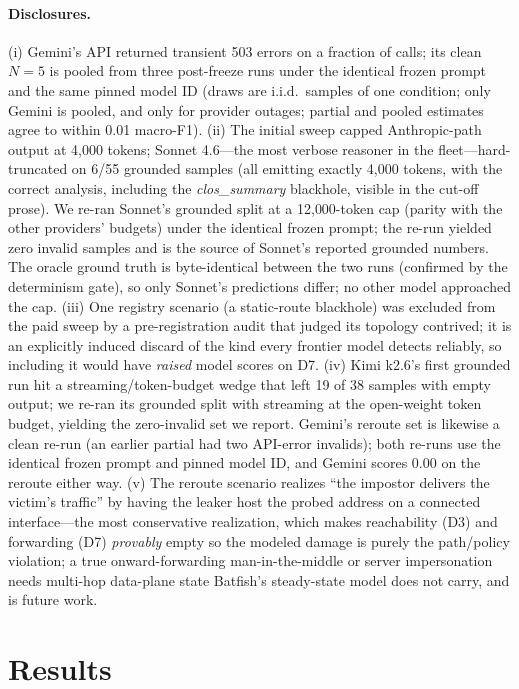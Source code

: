 \documentclass[11pt]{article}
\begin{document}
\paragraph{Disclosures.} (i) Gemini's API returned transient 503 errors on a
fraction of calls; its clean $N{=}5$ is pooled from three post-freeze runs
under the identical frozen prompt and the same pinned model ID (draws are
i.i.d.\ samples of one condition; only Gemini is pooled, and only for
provider outages; partial and pooled estimates agree to within 0.01
macro-F1). (ii) The initial sweep capped Anthropic-path output at 4{,}000
tokens; Sonnet 4.6---the most verbose reasoner in the fleet---hard-truncated
on 6/55 grounded samples (all emitting exactly 4{,}000 tokens, with the
correct analysis, including the \emph{clos\_summary} blackhole, visible in the
cut-off prose). We re-ran Sonnet's grounded split at a 12{,}000-token cap
(parity with the other providers' budgets) under the identical frozen prompt;
the re-run yielded zero invalid samples and is the source of Sonnet's reported
grounded numbers. The oracle ground truth is byte-identical between the two
runs (confirmed by the determinism gate), so only Sonnet's predictions differ;
no other model approached the cap. (iii) One registry scenario (a static-route
blackhole) was excluded from the paid sweep by a pre-registration audit that
judged its topology contrived; it is an explicitly induced discard of the kind
every frontier model detects reliably, so including it would have \emph{raised}
model scores on D7. (iv) Kimi k2.6's first grounded run hit a
streaming/token-budget wedge that left 19 of 38 samples with empty output; we
re-ran its grounded split with streaming at the open-weight token budget,
yielding the zero-invalid set we report. Gemini's reroute set is likewise a
clean re-run (an earlier partial had two API-error invalids); both re-runs use
the identical frozen prompt and pinned model ID, and Gemini scores 0.00 on the
reroute either way. (v) The reroute scenario realizes ``the impostor delivers
the victim's traffic'' by having the leaker host the probed address on a
connected interface---the most conservative realization, which makes
reachability (D3) and forwarding (D7) \emph{provably} empty so the modeled
damage is purely the path/policy violation; a true onward-forwarding
man-in-the-middle or server impersonation needs multi-hop data-plane state
Batfish's steady-state model does not carry, and is future work.

\section{Results}
\label{sec:results}
\end{document}

